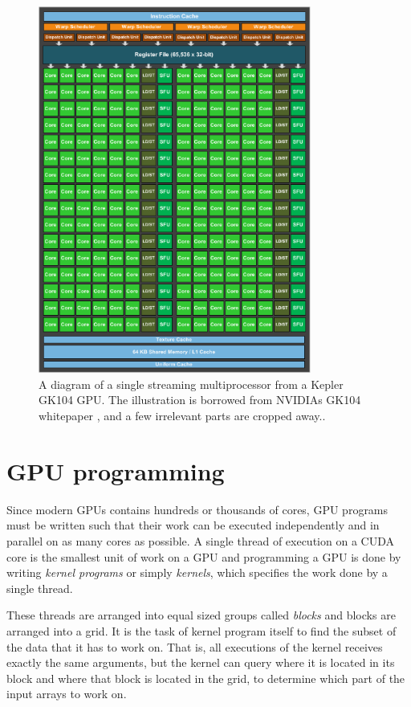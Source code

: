 \begin{figure}
  \centering
  \includegraphics[width=0.8\textwidth]{graphics/nvidia_kepler_gk104_sm_cropped}
  \vspace{2mm}
  \caption{A diagram of a single streaming multiprocessor from a
    Kepler GK104 GPU. The illustration is borrowed from NVIDIAs GK104
    whitepaper \cite{nvidia2012geforcegtx680}, and a few irrelevant
    parts are cropped away..}
  \label{fig:kepler_sm}
\end{figure}

\section{GPU programming}
Since modern GPUs contains hundreds or thousands of cores, GPU
programs must be written such that their work can be executed
independently and in parallel on as many cores as possible. A single
thread of execution on a CUDA core is the smallest unit of work on a
GPU and programming a GPU is done by writing \textit{kernel programs}
or simply \textit{kernels}, which specifies the work done by a single
thread.

These threads are arranged into equal sized groups called
\textit{blocks} and blocks are arranged into a grid.  It is the task
of kernel program itself to find the subset of the data that it has
to work on. That is, all executions of the kernel receives exactly the
same arguments, but the kernel can query where it is located in its
block and where that block is located in the grid, to determine which
part of the input arrays to work on.

